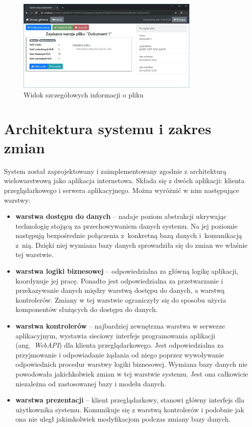 \begin{figure}[!ht]
\centering
\includegraphics[width=0.8\textwidth]{figures/plik.jpg}
\caption{Widok szczegółowych informacji o pliku}
\label{fig:sysFunFile}
\end{figure}

\section{Architektura systemu i zakres zmian}

System został zaprojektowany i zaimplementowany zgodnie z architekturą wielowarstwową jako aplikacja internetowa.
Składa się z dwóch aplikacji: klienta przeglądarkowego i serwera aplikacyjnego.
Można wyróżnić w nim następujące warstwy:
\begin{itemize}
    \item \textbf{warstwa dostępu do danych} -- nadaje poziom abstrakcji ukrywając technologię stojącą za przechowywaniem danych systemu.
    Na jej poziomie następują bezpośrednie połączenia z~konkretną bazą danych i~komunikacją z~nią.
    Dzięki niej wymiana bazy danych sprowadziła się do zmian we właśnie tej warstwie.
    \item \textbf{warstwa logiki biznesowej} -- odpowiedzialna za główną logikę aplikacji, koordynuje jej pracę. 
    Ponadto jest odpowiedzialna za przetwarzanie i przekazywanie danych między warstwą dostępu do danych, a warstwą kontrolerów.
    Zmiany w tej warstwie ograniczyły się do sposobu użycia komponentów służących do dostępu do danych.
    \item \textbf{warstwa kontrolerów} -- najbardziej zewnętrzna warstwa w serwerze aplikacyjnym, wystawia sieciowy interfejs programowania aplikacji (ang.~\textit{WebAPI}) dla klienta przeglądarkowego.
    Jest odpowiedzialna za przyjmowanie i odpowiadanie żądania od niego poprzez wywoływanie odpowiednich procedur warstwy logiki biznesowej.
    Wymiana bazy danych nie powodowała jakichkolwiek zmian w tej warstwie systemu.
    Jest ona całkowicie niezależna od zastosowanej bazy i modelu danych.
    \item \textbf{warstwa prezentacji} -- klient przeglądarkowy, stanowi główny interfejs dla użytkownika systemu.
    Komunikuje się z warstwą kontrolerów i podobnie jak ona nie uległ jakimkolwiek modyfikacjom podczas zmiany bazy danych. 
\end{itemize}


